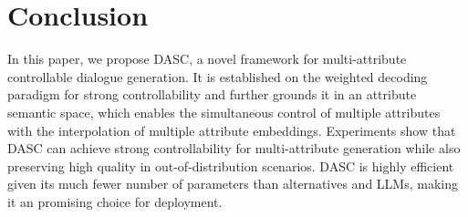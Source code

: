 \section{Conclusion}

In this paper, we propose DASC, a novel framework for multi-attribute controllable dialogue generation. It is established on the weighted decoding paradigm for strong controllability and further grounds it in an attribute semantic space, which enables the simultaneous control of multiple attributes with the interpolation of multiple attribute embeddings. Experiments show that DASC can achieve strong controllability for multi-attribute generation while also preserving high quality in out-of-distribution scenarios. DASC is highly efficient given its much fewer number of parameters than alternatives and LLMs, making it an promising choice for deployment.
